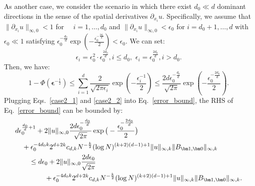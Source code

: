 As another case, we consider the scenario in which there exist $d_0 \ll d$ dominant directions in the sense of the spatial derivatives $\partial_{x_i} u$. Specifically, we assume that $\|\partial_{x_i} u\|_{\infty,0} < 1$ for $\quad i = 1,\ldots,d_0$ and $\|\partial_{x_i} u\|_{\infty,0} < \epsilon_0$ for $i = d_0+1,\ldots,d$ with $\epsilon_0 \ll 1$ satisfying $\epsilon_0^{-\frac{d_0}{d}}\exp(-\frac{\epsilon_0^{-\frac{2d_0}{d}}}{2})<\epsilon_0$.
We can set:
\begin{equation}
    \epsilon_i=\epsilon_0^2\cdot\epsilon_0^{\frac{2d_0}{d}}, i\leq d_0,\,\, \epsilon_i=\epsilon_0^{\frac{2d_0}{d}}, i>d_0.
    \label{case2_1}
\end{equation}
Then, we have:
\begin{equation}
    1 - \Phi(\bm\epsilon^{-\frac{1}{2}})\leq \sum_{i=1}^d\frac{2}{\sqrt{2\pi\epsilon_i}}\exp(-\frac{\epsilon_i^{-1}}{2})\leq \frac{2d\epsilon_0^{-\frac{d_0}{d}}}{\sqrt{2\pi}}\exp(-\frac{\epsilon_0^{-\frac{2d_0}{d}}}{2}).
    \label{case2_2}
\end{equation}
Plugging Eqs.~\eqref{case2_1} and \eqref{case2_2} into Eq.~\eqref{error_bound}, the RHS of Eq.~\eqref{error_bound} can be bounded by:
\begin{equation}
\begin{aligned}
        &d\epsilon_0^{\frac{d_0}{d}+1} + 2\|u\|_{\infty, 0}\frac{2d\epsilon_0^{-\frac{d_0}{d}}}{\sqrt{2\pi}}\exp\big(-\frac{\epsilon_0^{-\frac{2d_0}{d}}}{2}\big)\\
        &\quad+\epsilon_0^{-4d_0k}2^{d+2k}c_{d, k}N^{-\frac{k}{2}}(\log N)^{(k+2)(d-1)+1}\|u\|_{\infty, k}\|B_{\bm 1, \bm0}\|_{\infty, k}\\
    &\quad\quad\leq d\epsilon_0 + 2\|u\|_{\infty, 0}\frac{2d\epsilon_0}{\sqrt{2\pi}} \\
    &\hspace{1.5cm}+ \epsilon_0^{-4d_0k}2^{d+2k}c_{d, k}N^{-\frac{k}{2}}(\log N)^{(k+2)(d-1)+1}\|u\|_{\infty, k}\|B_{\bm 1, \bm0}\|_{\infty, k}.
\end{aligned}
    \label{error_bound1}
\end{equation}

